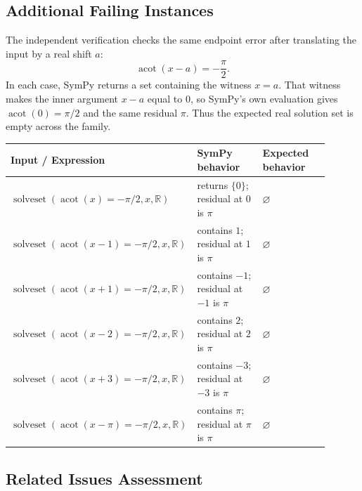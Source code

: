 \documentclass[11pt]{article}
\begin{document}
\subsection{Additional Failing Instances}

The independent verification checks the same endpoint error after translating the input by a real shift \(a\):
\[
  \operatorname{acot}(x-a)=-\frac{\pi}{2}.
\]
In each case, SymPy returns a set containing the witness \(x=a\). That witness makes the inner argument \(x-a\) equal to \(0\), so SymPy's own evaluation gives \(\operatorname{acot}(0)=\pi/2\) and the same residual \(\pi\). Thus the expected real solution set is empty across the family.

\begin{center}
\renewcommand{\arraystretch}{1.3}
\begin{tabular}{@{}>{\raggedright\arraybackslash}p{0.44\linewidth}>{\raggedright\arraybackslash}p{0.23\linewidth}>{\raggedright\arraybackslash}p{0.23\linewidth}@{}}
\toprule
\textbf{Input / Expression} & \textbf{SymPy behavior} & \textbf{Expected behavior} \\
\midrule
\(\operatorname{solveset}(\operatorname{acot}(x)=-\pi/2, x, \mathbb{R})\) & returns \(\{0\}\); residual at \(0\) is \(\pi\) & \(\varnothing\) \\
\(\operatorname{solveset}(\operatorname{acot}(x-1)=-\pi/2, x, \mathbb{R})\) & contains \(1\); residual at \(1\) is \(\pi\) & \(\varnothing\) \\
\(\operatorname{solveset}(\operatorname{acot}(x+1)=-\pi/2, x, \mathbb{R})\) & contains \(-1\); residual at \(-1\) is \(\pi\) & \(\varnothing\) \\
\(\operatorname{solveset}(\operatorname{acot}(x-2)=-\pi/2, x, \mathbb{R})\) & contains \(2\); residual at \(2\) is \(\pi\) & \(\varnothing\) \\
\(\operatorname{solveset}(\operatorname{acot}(x+3)=-\pi/2, x, \mathbb{R})\) & contains \(-3\); residual at \(-3\) is \(\pi\) & \(\varnothing\) \\
\(\operatorname{solveset}(\operatorname{acot}(x-\pi)=-\pi/2, x, \mathbb{R})\) & contains \(\pi\); residual at \(\pi\) is \(\pi\) & \(\varnothing\) \\
\bottomrule
\end{tabular}
\end{center}

\subsection{Related Issues Assessment}
\end{document}
